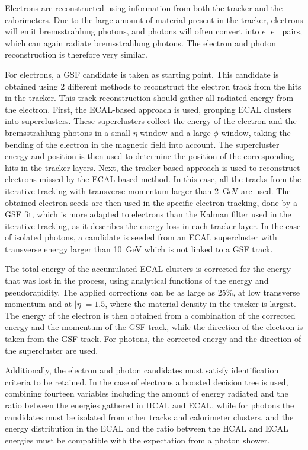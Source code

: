 Electrons are reconstructed using information from both the tracker and the calorimeters. Due to the large amount of material present in the tracker, electrons will emit bremsstrahlung photons, and photons will often convert into $e^+e^-$ pairs, which can again radiate bremsstrahlung photons. The electron and photon reconstruction is therefore very similar.

For electrons, a \ac{GSF} candidate is taken as starting point. This candidate is obtained using 2 different methods to reconstruct the electron track from the hits in the tracker. This track reconstruction should gather all radiated energy from the electron. First, the ECAL-based approach is used, grouping \ac{ECAL} clusters into superclusters. These superclusters collect the energy of the electron and the bremsstrahlung photons in a small $\eta$ window and a large $\phi$ window, taking the bending of the electron in the magnetic field into account. The supercluster energy and position is then used to determine the position of the corresponding hits in the tracker layers. Next, the tracker-based approach is used to reconstruct electrons missed by the ECAL-based method. In this case, all the tracks from the iterative tracking with transverse momentum larger than \SI{2}{GeV} are used. The obtained electron seeds are then used in the specific electron tracking, done by a \ac{GSF} fit, which is more adapted to electrons than the Kalman filter used in the iterative tracking, as it describes the energy loss in each tracker layer. In the case of isolated photons, a candidate is seeded from an \ac{ECAL} supercluster with transverse energy larger than \SI{10}{GeV} which is not linked to a \ac{GSF} track.

The total energy of the accumulated \ac{ECAL} clusters is corrected for the energy that was lost in the process, using analytical functions of the energy and pseudorapidity. The applied corrections can be as large as 25\%, at low transverse momentum and at $|\eta| = 1.5$, where the material density in the tracker is largest. The energy of the electron is then obtained from a combination of the corrected energy and the momentum of the \ac{GSF} track, while the direction of the electron is taken from the \ac{GSF} track. For photons, the corrected energy and the direction of the supercluster are used.

Additionally, the electron and photon candidates must satisfy identification criteria to be retained. In the case of electrons a boosted decision tree is used, combining fourteen variables including the amount of energy radiated and the ratio between the energies gathered in HCAL and ECAL, while for photons the candidates must be isolated from other tracks and calorimeter clusters, and the energy distribution in the \ac{ECAL} and the ratio between the \ac{HCAL} and \ac{ECAL} energies must be compatible with the expectation from a photon shower.

